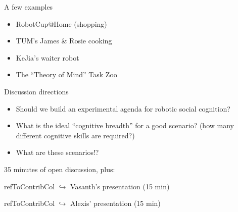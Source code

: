 \documentclass[compress]{beamer}
\newcommand{\refToContrib}[1]{%
    \begin{beamercolorbox}[wd=\linewidth,ht=2ex,dp=0.7ex]{refToContribCol}%
    \hspace{0.5em}$\hookrightarrow$ #1%
    \end{beamercolorbox}%
}%
\begin{document}
\begin{frame}{A few examples}
    \small
    \begin{multicols}{2}
    \begin{itemize}
        \item<1-> RobotCup@Home (shopping)
        \item<2-> TUM's James \& Rosie cooking \vfill\columnbreak
        \item<3-> KeJia's waiter robot
        \item<4-> The ``Theory of Mind'' Task Zoo
    \end{itemize}
    \end{multicols}

    \centering
\end{frame}

\begin{frame}{Discussion directions}

    \begin{itemize}
        \item Should we build an experimental agenda for robotic social cognition?
        \item What is the ideal ``cognitive breadth'' for a good scenario? (how many
            different cognitive skills are required?)
        \item What are these scenarios!?
    \end{itemize}

    35 minutes of open discussion, plus:
    \refToContrib{Vasanth's presentation (15 min)}
    \refToContrib{Alexis' presentation (15 min)}

\end{frame}
\end{document}
